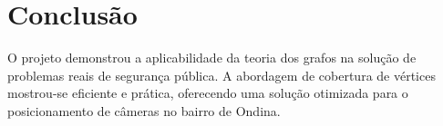 \documentclass[12pt, a4paper]{report}
\begin{document}
\section{Conclusão}
O projeto demonstrou a aplicabilidade da teoria dos grafos na solução de problemas reais de segurança pública. A abordagem de cobertura de vértices mostrou-se eficiente e prática, oferecendo uma solução otimizada para o posicionamento de câmeras no bairro de Ondina.

\newpage
\renewcommand{\refname}{Referências Bibliográficas}

\nocite{*}
\end{document}
